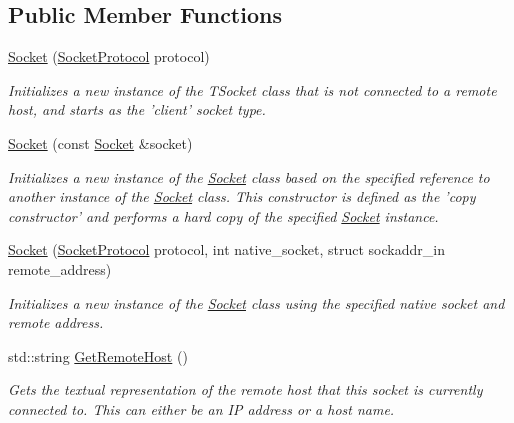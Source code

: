 \subsection*{Public Member Functions}
\begin{DoxyCompactItemize}
\item 
\hyperlink{class_senergy_1_1_networking_1_1_socket_a0dac1aaaf33a465923caec6d60156879}{Socket} (\hyperlink{class_senergy_1_1_networking_1_1_socket_a83b2c6873ed6de08855f226e473d9eb9}{Socket\-Protocol} protocol)
\begin{DoxyCompactList}\small\item\em Initializes a new instance of the T\-Socket class that is not connected to a remote host, and starts as the 'client' socket type. \end{DoxyCompactList}\item 
\hyperlink{class_senergy_1_1_networking_1_1_socket_aa6a06a0a8e5dd2bd9f831a843d13ed75}{Socket} (const \hyperlink{class_senergy_1_1_networking_1_1_socket}{Socket} \&socket)
\begin{DoxyCompactList}\small\item\em Initializes a new instance of the \hyperlink{class_senergy_1_1_networking_1_1_socket}{Socket} class based on the specified reference to another instance of the \hyperlink{class_senergy_1_1_networking_1_1_socket}{Socket} class. This constructor is defined as the 'copy constructor' and performs a hard copy of the specified \hyperlink{class_senergy_1_1_networking_1_1_socket}{Socket} instance. \end{DoxyCompactList}\item 
\hyperlink{class_senergy_1_1_networking_1_1_socket_a06b93c702b77c936f6bdfec55a243177}{Socket} (\hyperlink{class_senergy_1_1_networking_1_1_socket_a83b2c6873ed6de08855f226e473d9eb9}{Socket\-Protocol} protocol, int native\-\_\-socket, struct sockaddr\-\_\-in remote\-\_\-address)
\begin{DoxyCompactList}\small\item\em Initializes a new instance of the \hyperlink{class_senergy_1_1_networking_1_1_socket}{Socket} class using the specified native socket and remote address. \end{DoxyCompactList}\item 
std\-::string \hyperlink{class_senergy_1_1_networking_1_1_socket_a3839f6b5e87e7e53007fa15246159830}{Get\-Remote\-Host} ()
\begin{DoxyCompactList}\small\item\em Gets the textual representation of the remote host that this socket is currently connected to. This can either be an I\-P address or a host name. \end{DoxyCompactList}\item 

\end{DoxyCompactItemize}
